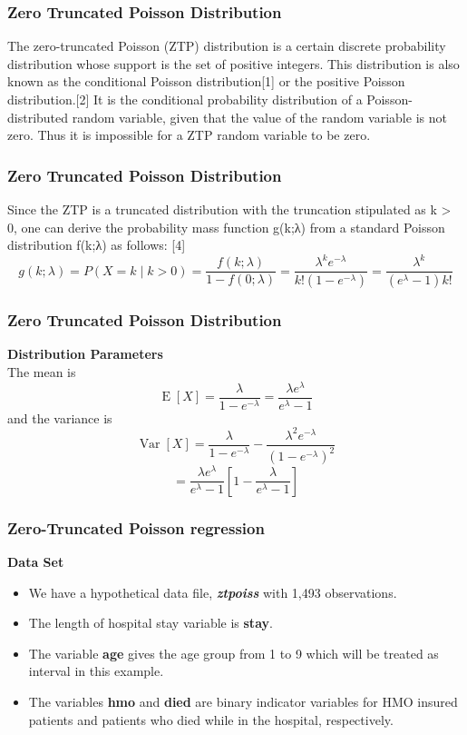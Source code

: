 \documentclass[MASTER.tex]{subfiles}
\begin{document}

\begin{frame}
\frametitle{Zero Truncated Poisson Distribution}
\Large

The zero-truncated Poisson (ZTP) distribution is a certain discrete probability distribution whose support is the set of positive integers. This distribution is also known as the conditional Poisson distribution[1] or the positive Poisson distribution.[2] It is the conditional probability distribution of a Poisson-distributed random variable, given that the value of the random variable is not zero. Thus it is impossible for a ZTP random variable to be zero. 

\end{frame}
\begin{frame}
\frametitle{Zero Truncated Poisson Distribution}
\Large
Since the ZTP is a truncated distribution with the truncation stipulated as k > 0, one can derive the probability mass 
function g(k;λ) from a standard Poisson distribution f(k;λ) as follows: [4]
\[g(k;\lambda) = P(X = k \mid k > 0) = 
\frac{f(k;\lambda)}{1-f(0;\lambda)} = 
\frac{\lambda ^ k e^{- \lambda} }{k ! \left ( 1 - e^{- \lambda} \right )} = \frac{\lambda^k}{(e^\lambda-1)k!}\]

\end{frame}
\begin{frame}
	\frametitle{Zero Truncated Poisson Distribution}
	\Large
\textbf{Distribution Parameters}\\
The mean is
\[ \operatorname{E}[X]=\frac{\lambda}{1-e^{-\lambda}}=\frac{\lambda e^\lambda}{e^\lambda-1} \]
and the variance is
\[ \operatorname{Var}[X]=\frac{\lambda}{1-e^{-\lambda}} - \frac{\lambda^2 e^{-\lambda}}{(1-e^{-\lambda})^2}\] 
\[ = \frac{\lambda e^\lambda}{e^\lambda-1}\left[1-\frac{\lambda}{e^\lambda-1}\right] \]

\end{frame}

\begin{frame}
\frametitle{Zero-Truncated Poisson regression}
\textbf{Data Set}
\begin{itemize}
	\item 
We have a hypothetical data file, \textbf{\textit{ztpoiss}} with 1,493 observations. 
\item The length of hospital stay variable is \textbf{stay}. 
\item The variable \textbf{age} gives the age group from 1 to 9 which will be treated as interval in this example. 
\item The variables \textbf{hmo} and \textbf{died} are binary indicator variables for HMO insured patients and patients who died while in the hospital, respectively.
\end{itemize}
\end{frame}
\end{document}
